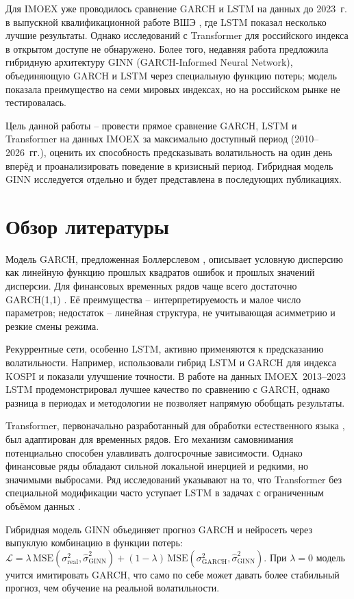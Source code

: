 \documentclass[a4paper,12pt]{article}
\begin{document}
Для IMOEX уже проводилось сравнение GARCH и LSTM на данных до 2023~г. в выпускной квалификационной работе ВШЭ \cite{HSE_VKR}, где LSTM показал несколько лучшие результаты. Однако исследований с Transformer для российского индекса в открытом доступе не обнаружено. Более того, недавняя работа \cite{Xu2024} предложила гибридную архитектуру GINN (GARCH-Informed Neural Network), объединяющую GARCH и LSTM через специальную функцию потерь; модель показала преимущество на семи мировых индексах, но на российском рынке не тестировалась.

Цель данной работы -- провести прямое сравнение GARCH, LSTM и Transformer на данных IMOEX за максимально доступный период (2010--2026~гг.), оценить их способность предсказывать волатильность на один день вперёд и проанализировать поведение в кризисный период. Гибридная модель GINN исследуется отдельно и будет представлена в последующих публикациях.

\section{Обзор литературы}
Модель GARCH, предложенная Боллерслевом \cite{Bollerslev1986}, описывает условную дисперсию как линейную функцию прошлых квадратов ошибок и прошлых значений дисперсии. Для финансовых временных рядов чаще всего достаточно GARCH(1,1) \cite{HansenLunde2005}. Её преимущества -- интерпретируемость и малое число параметров; недостаток -- линейная структура, не учитывающая асимметрию и резкие смены режима.

Рекуррентные сети, особенно LSTM, активно применяются к предсказанию волатильности. Например, \cite{KimWon2018} использовали гибрид LSTM и GARCH для индекса KOSPI и показали улучшение точности. В работе \cite{HSE_VKR} на данных IMOEX~2013--2023 LSTM продемонстрировал лучшее качество по сравнению с GARCH, однако разница в периодах и методологии не позволяет напрямую обобщать результаты.

Transformer, первоначально разработанный для обработки естественного языка \cite{Vaswani2017}, был адаптирован для временных рядов. Его механизм самовнимания потенциально способен улавливать долгосрочные зависимости. Однако финансовые ряды обладают сильной локальной инерцией и редкими, но значимыми выбросами. Ряд исследований указывают на то, что Transformer без специальной модификации часто уступает LSTM в задачах с ограниченным объёмом данных \cite{Zeng2022}.

Гибридная модель GINN \cite{Xu2024} объединяет прогноз GARCH и нейросеть через выпуклую комбинацию в функции потерь: \( \mathcal{L} = \lambda\,\text{MSE}(\sigma^2_{\text{real}}, \hat{\sigma}^2_{\text{GINN}}) + (1-\lambda)\,\text{MSE}(\sigma^2_{\text{GARCH}}, \hat{\sigma}^2_{\text{GINN}}) \). При \(\lambda=0\) модель учится имитировать GARCH, что само по себе может давать более стабильный прогноз, чем обучение на реальной волатильности.
\end{document}
